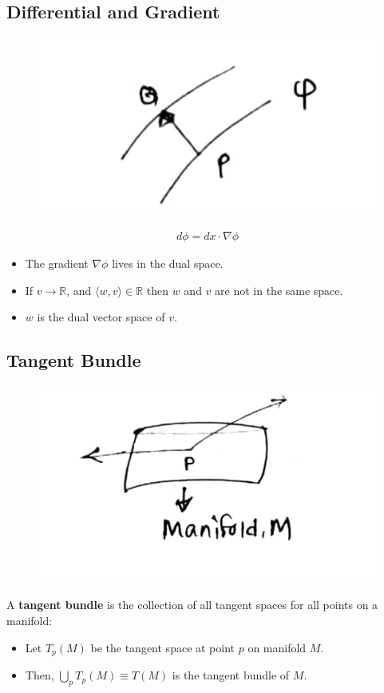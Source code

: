\documentclass[14pt]{article} %
\begin{document}
\subsection*{Differential and Gradient}
\vspace{-1cm}
\begin{figure}[H]
\centering
\includegraphics[width=0.3\linewidth]{figures/L2_2.jpg}
\caption*{}
\end{figure}
\vspace{-1.5cm}
\begin{align*}
    d\phi = dx\cdot \nabla \phi
\end{align*}
\begin{itemize}
    \item The gradient $\nabla \phi$ lives in the dual space.
    \item If $v \to \mathbb{R}$, and $\langle w,v \rangle \in \mathbb{R}$ then $w$ and $v$ are not in the same space.
    \item $w$ is the dual vector space of $v$.
\end{itemize}

\subsection*{Tangent Bundle}
\vspace{-1cm}
\begin{figure}[H]
\centering
\includegraphics[width=0.45\linewidth]{figures/L2_3.jpg}
\caption*{}
\end{figure}
\vspace{-1.5cm}
A \textbf{tangent bundle} is the collection of all tangent spaces for all points on a manifold:
\begin{itemize}
    \item Let $T_p(M)$ be the tangent space at point $p$ on manifold $M$.
    \item Then, $\bigcup_p T_p(M) \equiv T(M)$ is the tangent bundle of $M$.
\end{itemize}
\begin{center}
\end{center}
\end{document}
